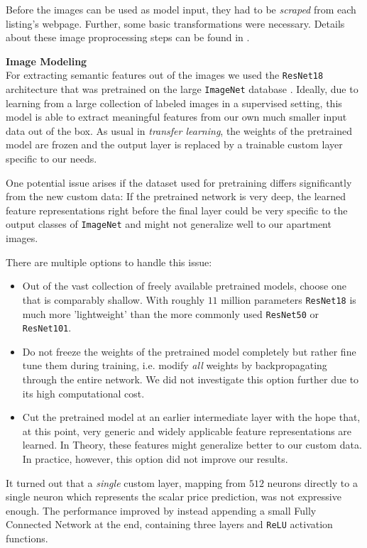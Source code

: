 Before the images can be used as model input, they had to be \emph{scraped} from each listing's webpage.
Further, some basic transformations were necessary.
Details about these image proprocessing steps can be found in .


\textbf{Image Modeling} \\
For extracting semantic features out of the images we used the \texttt{ResNet18} architecture that was pretrained on the large \texttt{ImageNet} database \citep{russakovsky2015}.
Ideally, due to learning from a large collection of labeled images in a supervised setting, this model is able to extract meaningful features from our own much smaller input data out of the box.
As usual in \emph{transfer learning}, the weights of the pretrained model are frozen and the output layer is replaced by a trainable custom layer specific to our needs.

One potential issue arises if the dataset used for pretraining differs significantly from the new custom data:
If the pretrained network is very deep, the learned feature representations right before the final layer could be very specific to the output classes of \texttt{ImageNet} and might not generalize well to our apartment images.

There are multiple options to handle this issue:
\begin{itemize}
  \item Out of the vast collection of freely available pretrained models, choose one that is comparably shallow.
        With roughly $11$ million parameters \texttt{ResNet18} is much more 'lightweight' than the more commonly used \texttt{ResNet50} or \texttt{ResNet101}.
  \item Do not freeze the weights of the pretrained model completely but rather fine tune them during training, i.e. modify \emph{all} weights by backpropagating through the entire network.
        We did not investigate this option further due to its high computational cost.
  \item Cut the pretrained model at an earlier intermediate layer with the hope that, at this point, very generic and widely applicable feature representations are learned.
        In Theory, these features might generalize better to our custom data.
        In practice, however, this option did not improve our results.
\end{itemize}

It turned out that a \emph{single} custom layer, mapping from $512$ neurons directly to a single neuron which represents the scalar price prediction, was not expressive enough.
The performance improved by instead appending a small Fully Connected Network at the end, containing three layers and \texttt{ReLU} activation functions.

